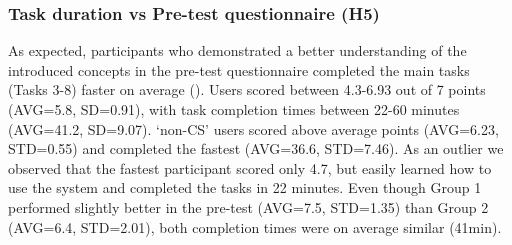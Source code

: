 \subsubsection{Task duration vs Pre-test questionnaire (H5)} 
As expected, participants who demonstrated a better understanding of the introduced concepts in the pre-test questionnaire completed the main tasks (Tasks 3-8) faster on average ().
Users scored between 4.3-6.93 out of 7 points (AVG=5.8, SD=0.91), with task completion times between 22-60 minutes (AVG=41.2, SD=9.07).
`non-CS' users scored above average points (AVG=6.23, STD=0.55) and completed the fastest (AVG=36.6, STD=7.46).
As an outlier we observed that the fastest participant scored only 4.7, but easily learned how to use the system and completed the tasks in 22 minutes.
Even though Group 1 performed slightly better in the pre-test (AVG=7.5, STD=1.35) than Group 2 (AVG=6.4, STD=2.01), both completion times were on average similar (41min).




